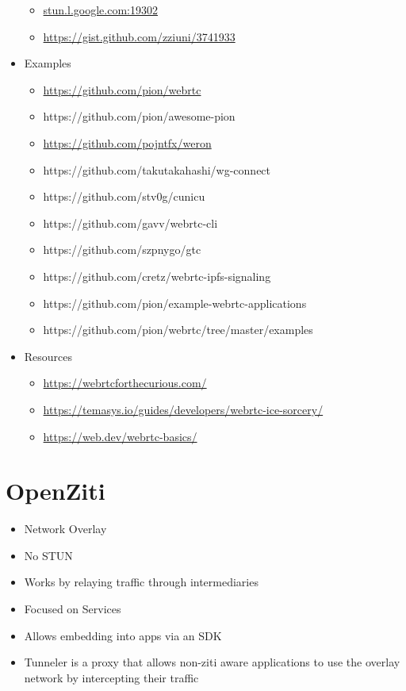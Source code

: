 \begin{itemize}
  \begin{itemize}
  \tightlist
  \item
    \href{http://stun.l.google.com:19302/}{stun.l.google.com:19302}
  \item
    \url{https://gist.github.com/zziuni/3741933}
  \end{itemize}
\item
  Examples

  \begin{itemize}
  \tightlist
  \item
    \url{https://github.com/pion/webrtc}
  \item
    https://github.com/pion/awesome-pion
  \item
    \url{https://github.com/pojntfx/weron}
  \item
    https://github.com/takutakahashi/wg-connect
  \item
    https://github.com/stv0g/cunicu
  \item
    https://github.com/gavv/webrtc-cli
  \item
    https://github.com/szpnygo/gtc
  \item
    https://github.com/cretz/webrtc-ipfs-signaling
  \item
    https://github.com/pion/example-webrtc-applications
  \item
    https://github.com/pion/webrtc/tree/master/examples
  \end{itemize}
\item
  Resources

  \begin{itemize}
  \tightlist
  \item
    \url{https://webrtcforthecurious.com/}
  \item
    \url{https://temasys.io/guides/developers/webrtc-ice-sorcery/}
  \item
    \href{https://web.dev/webrtc-basics/\#toc-rtcpeerconnection}{https://web.dev/webrtc-basics/}
  \end{itemize}
\end{itemize}

\hypertarget{notes__02180-openziti.md}{}
\hypertarget{notes__02180-openziti.md__openziti}{%
\section{OpenZiti}\label{notes__02180-openziti.md__openziti}}

\begin{itemize}
\tightlist
\item
  Network Overlay
\item
  No STUN
\item
  Works by relaying traffic through intermediaries
\item
  Focused on Services
\item
  Allows embedding into apps via an SDK
\item
  Tunneler is a proxy that allows non-ziti aware applications to use the
  overlay network by intercepting their traffic
\end{itemize}

